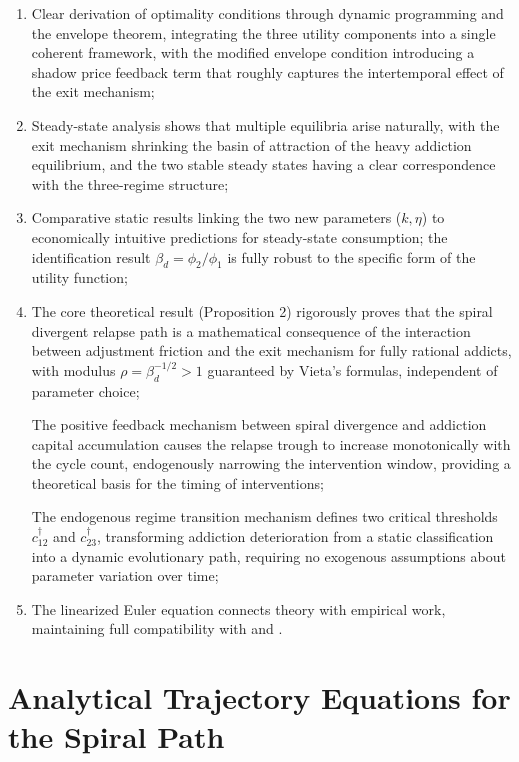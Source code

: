 \documentclass[12pt]{article}
\begin{document}
\begin{enumerate}

\item Clear derivation of optimality conditions through dynamic programming and the envelope theorem, integrating the three utility components into a single coherent
framework, with the modified envelope condition introducing a shadow price feedback term that roughly captures the intertemporal effect of the exit mechanism;

\item Steady-state analysis shows that multiple equilibria arise naturally, with the exit mechanism shrinking the basin of attraction of the heavy addiction equilibrium, and the two
stable steady states having a clear correspondence with the three-regime structure;

\item Comparative static results linking the two new parameters ($k, \eta$) to economically intuitive predictions for steady-state consumption;
the identification result $\beta_d = \phi_2/\phi_1$ is fully robust to the specific form of the utility function;

\item The core theoretical result (Proposition 2) rigorously proves that the spiral divergent relapse path is a mathematical consequence of the interaction between adjustment friction
and the exit mechanism for fully rational addicts, with modulus $\rho = \beta_d^{-1/2} > 1$ guaranteed by Vieta's formulas, independent of parameter choice;

The positive feedback mechanism between spiral divergence and addiction capital accumulation causes the relapse trough to increase monotonically with the cycle count, endogenously narrowing the intervention window, providing a theoretical basis for the timing of interventions;

The endogenous regime transition mechanism defines two critical thresholds $c^\dagger_{12}$ and $c^\dagger_{23}$, transforming addiction deterioration from a
static classification into a dynamic evolutionary path, requiring no exogenous assumptions about parameter variation over time;

\item The linearized Euler equation connects theory with empirical work, maintaining full compatibility with \cite{Chaloupka1991} and \cite{Becker1994}.
\end{enumerate}

\appendix
\section{Analytical Trajectory Equations for the Spiral Path}
\label{app:analytic_spiral}
\end{document}

